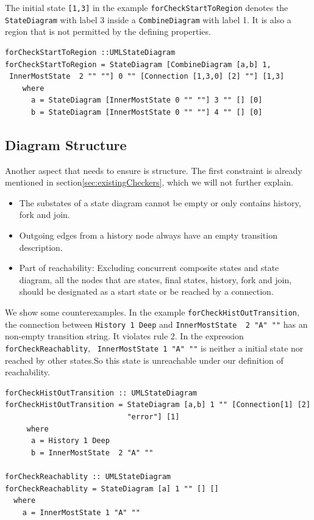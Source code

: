 The initial state \verb|[1,3]| in the example \verb|forCheckStartToRegion| denotes the \verb|StateDiagram| with label 3 inside a \verb|CombineDiagram| with label 1.
It is also a region that is not permitted by the defining properties.
\begin{verbatim}
forCheckStartToRegion ::UMLStateDiagram
forCheckStartToRegion = StateDiagram [CombineDiagram [a,b] 1,
 InnerMostState  2 "" ""] 0 "" [Connection [1,3,0] [2] ""] [1,3]
    where
      a = StateDiagram [InnerMostState 0 "" ""] 3 "" [] [0]
      b = StateDiagram [InnerMostState 0 "" ""] 4 "" [] [0] 
\end{verbatim}




\subsection{Diagram Structure}
\label{sec:structure}
Another aspect that needs to ensure is structure. The first constraint is already mentioned in section\ref{sec:existingCheckers}, which we will not further explain.
\begin{itemize}
\item The substates of a state diagram cannot be empty or only contains history, fork and join.
\end{itemize}
\begin{itemize}
\item Outgoing edges from a history node always have an empty transition description.
\end{itemize}
\begin{itemize}
\item Part of reachability: Excluding concurrent composite states and state diagram, all the nodes that are states, final states, history, fork and join, should be designated as a start state or be reached by a connection.
\end{itemize}

We show some counterexamples. 
In the example \verb|forCheckHistOutTransition|, the connection between \verb|History 1 Deep| and \verb|InnerMostState  2 "A" ""|  has an non-empty transition string.
It violates rule 2.
In the expression \verb|forCheckReachablity|, \verb| InnerMostState 1 "A" ""| is neither a initial state nor reached by other states.So this state is unreachable under our definition of reachability.
\begin{verbatim}
forCheckHistOutTransition :: UMLStateDiagram
forCheckHistOutTransition = StateDiagram [a,b] 1 "" [Connection[1] [2] 
                            "error"] [1]
     where
      a = History 1 Deep
      b = InnerMostState  2 "A" ""

forCheckReachablity :: UMLStateDiagram
forCheckReachablity = StateDiagram [a] 1 "" [] []
  where
    a = InnerMostState 1 "A" ""
\end{verbatim}




